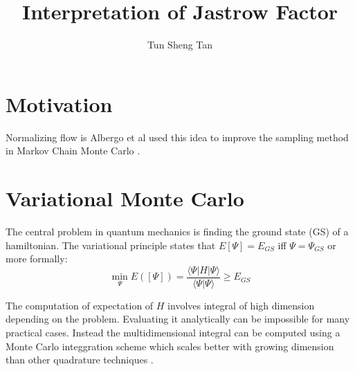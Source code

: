 \documentclass[12pt,a4paper]{article}
\title{Interpretation of Jastrow Factor}
\author{Tun Sheng Tan}
\begin{document}
\maketitle

\section{Motivation}
Normalizing flow is
Albergo et al used this idea to improve the sampling method in Markov Chain Monte Carlo \cite{Albergo1904.12072}.
\section{Variational Monte Carlo}
The central problem in quantum mechanics is finding the ground state (GS) of a hamiltonian.
The variational principle states that $E[\Psi]=E_{GS}$ iff $\Psi=\Psi_{GS}$ or more
formally:
\begin{equation}
\min_{\Psi} E([\Psi]) = \frac{\langle \Psi | H|\Psi \rangle}{\langle \Psi | \Psi \rangle} \geq E_{GS}
\end{equation}

The computation of expectation of $H$ involves integral of high dimension depending on the
problem. Evaluating it analytically can be impossible for many practical cases. Instead
the multidimensional integral can be computed using a Monte Carlo integgration scheme which
scales better with growing dimension than other quadrature techniques \cite{TOULOUSE2016285}.
\end{document}
